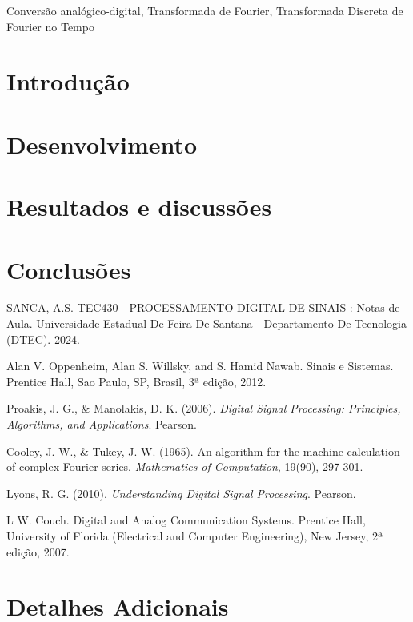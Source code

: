 \documentclass[conference]{IEEEtran}
\begin{document}
\begin{IEEEkeywords}
    Conversão analógico-digital, Transformada de Fourier, Transformada Discreta de Fourier no Tempo
\end{IEEEkeywords}

\section{Introdução}


\section{Desenvolvimento}


\section{Resultados e discussões}


\section{Conclusões}



\begin{thebibliography}{00}
     SANCA, A.S. TEC430 - PROCESSAMENTO DIGITAL DE SINAIS : Notas de Aula. Universidade Estadual De Feira De Santana - Departamento De Tecnologia (DTEC). 2024.

     Alan V. Oppenheim, Alan S. Willsky, and S. Hamid Nawab. Sinais e Sistemas. Prentice Hall, Sao Paulo, SP, Brasil, 3ª edição, 2012.

    Proakis, J. G., \& Manolakis, D. K. (2006). \textit{Digital Signal Processing: Principles, Algorithms, and Applications}. Pearson.

    Cooley, J. W., \& Tukey, J. W. (1965). An algorithm for the machine calculation of complex Fourier series. \textit{Mathematics of Computation}, 19(90), 297-301.

    Lyons, R. G. (2010). \textit{Understanding Digital Signal Processing}. Pearson.

     L W. Couch. Digital and Analog Communication Systems. Prentice Hall, University of Florida (Electrical and Computer Engineering), New Jersey, 2ª edição, 2007.
\end{thebibliography}


\appendix
\section{Detalhes Adicionais}

\end{document}
